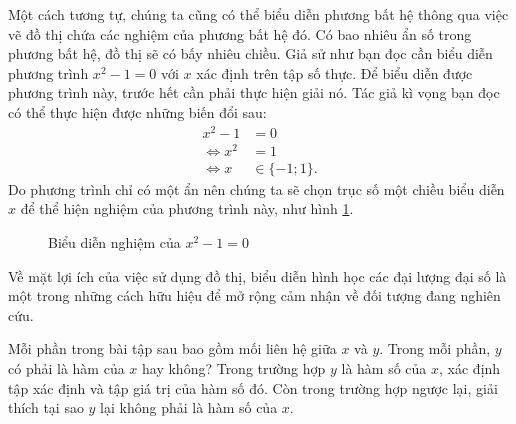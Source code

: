 Một cách tương tự, chúng ta cũng có thể biểu diễn phương bất hệ thông qua việc vẽ đồ thị chứa các nghiệm của phương bất hệ đó. Có bao nhiêu ẩn số trong phương bất hệ, đồ thị sẽ có bấy nhiêu chiều. Giả sử như bạn đọc cần biểu diễn phương trình $x^2 - 1 = 0$ với $x$ xác định trên tập số thực. Để biểu diễn được phương trình này, trước hết cần phải thực hiện giải nó. Tác giả kì vọng bạn đọc có thể thực hiện được những biến đổi sau:
\begin{align*}
   x^2 - 1 &= 0 \\
   \iff x^2 &= 1 \\
   \iff x &\in \{-1; 1\}.
\end{align*}
Do phương trình chỉ có một ẩn nên chúng ta sẽ chọn trục số một chiều biểu diễn $x$ để thể hiện nghiệm của phương trình này, như hình \ref{fig:ham_so_mot_bien:dinh_nghia:vdgpt}.

\begin{figure}[h]
   \centering
   \caption{Biểu diễn nghiệm của $x^2 - 1 = 0$}
   \label{fig:ham_so_mot_bien:dinh_nghia:vdgpt}
\end{figure}

Về mặt lợi ích của việc sử dụng đồ thị, biểu diễn hình học các đại lượng đại số là một trong những cách hữu hiệu để mở rộng cảm nhận về đối tượng đang nghiên cứu.
      
\exercise Mỗi phần trong bài tập sau bao gồm mối liên hệ giữa $x$ và $y$. Trong mỗi phần, $y$ có phải là hàm của $x$ hay không? Trong trường hợp $y$ là hàm số của $x$, xác định tập xác định và tập giá trị của hàm số đó. Còn trong trường hợp ngược lại, giải thích tại sao $y$ lại không phải là hàm số của $x$.


